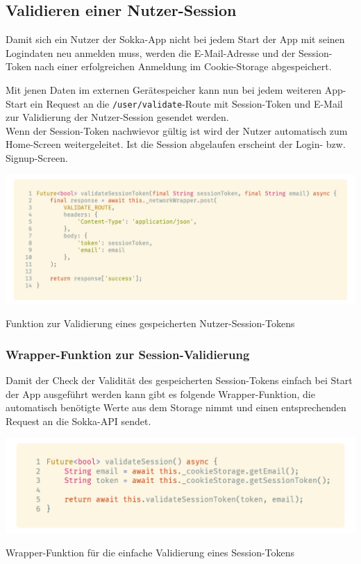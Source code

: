 \subsection{Validieren einer Nutzer-Session}

Damit sich ein Nutzer der Sokka-App nicht bei jedem Start der App mit seinen Logindaten neu
anmelden muss, werden die E-Mail-Adresse und der Session-Token nach einer erfolgreichen Anmeldung
im Cookie-Storage abgespeichert.

Mit jenen Daten im externen Gerätespeicher kann nun bei jedem weiteren App-Start ein Request an die
\lstinline{/user/validate}-Route mit Session-Token und E-Mail zur Validierung der Nutzer-Session
gesendet werden.\\
Wenn der Session-Token nachwievor gültig ist wird der Nutzer automatisch zum Home-Screen weitergeleitet.
Ist die Session abgelaufen erscheint der Login- bzw. Signup-Screen.

\begin{code}
    \centering
    \includegraphics[width=1\textwidth]{images/Client/services/user-auth/validate.png}
    \caption{Funktion zur Validierung eines gespeicherten Nutzer-Session-Tokens}
\end{code}

\subsubsection{Wrapper-Funktion zur Session-Validierung}

Damit der Check der Validität des gespeicherten Session-Tokens einfach
bei Start der App ausgeführt werden kann gibt es folgende Wrapper-Funktion,
die automatisch benötigte Werte aus dem Storage nimmt und einen entsprechenden
Request an die Sokka-API sendet.

\begin{code}
    \centering
    \includegraphics[width=1\textwidth]{images/Client/services/user-auth/validateSession.png}
    \caption{Wrapper-Funktion für die einfache Validierung eines Session-Tokens}
\end{code}